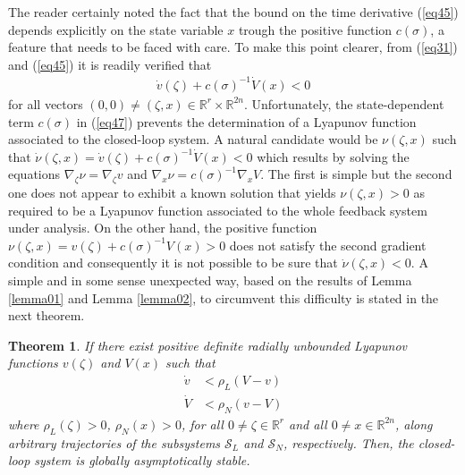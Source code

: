 \documentclass[twocolumn]{autarc_LH}
\newcommand{\Rf}{{\mathbb R}}
\newtheorem{theorem}{Theorem}
\begin{document}
The reader certainly noted the fact that the bound on the time derivative (\ref{eq45}) depends explicitly on the state variable $x$ trough the positive function $c(\sigma)$, a feature that needs to be faced with care. To make this point clearer, from (\ref{eq31}) and (\ref{eq45}) it is readily verified that 
\begin{align} 
\label{eq47} \dot v(\zeta) + c(\sigma)^{-1} \dot V(x) < 0
\end{align}
for all vectors $(0,0) \neq (\zeta, x) \in \Rf^{r} \times \Rf^{2n}$. Unfortunately, the state-dependent term $c(\sigma)$ in (\ref{eq47}) prevents the determination of a Lyapunov function associated to the closed-loop system. A natural candidate would be $\nu(\zeta,x)$ such that $\dot \nu(\zeta, x) = \dot v(\zeta) + c(\sigma)^{-1} \dot V(x) < 0$ which results by solving the equations $\nabla_{\zeta} \nu = \nabla_\zeta v$ and $\nabla_{x} \nu = c(\sigma)^{-1} \nabla_x V$. The first is simple but the second one does not appear to exhibit a known solution that yields $\nu(\zeta, x)>0$ as required to be a Lyapunov function associated to the whole feedback system under analysis. On the other hand, the positive function $\nu(\zeta,x)= v(\zeta) + c(\sigma)^{-1} V(x)>0$ does not satisfy the second gradient condition and consequently it is not possible to be sure that $\dot \nu(\zeta,x)<0$. A simple and in some sense unexpected way, based on the results of Lemma \ref{lemma01} and Lemma \ref{lemma02}, to circumvent this difficulty is stated in the next theorem.  
\begin{theorem} \label{theorem02}
If there exist positive definite radially unbounded Lyapunov functions $v(\zeta)$ and $V(x)$ such that 
\begin{align} 
\label{eq48} \dot v & < \rho_L  ( V - v )\\
\label{eq49} \dot V  & < \rho_N ( v - V )
\end{align}
where $\rho_L(\zeta)>0$, $\rho_N(x)>0$, for all $0 \neq \zeta \in \Rf^{r}$ and  all $0 \neq x \in \Rf^{2n}$, along arbitrary trajectories of the subsystems $\mathcal{S}_L$ and $\mathcal{S}_{N}$, respectively. Then, the closed-loop system is globally asymptotically stable. 
\end{theorem}
\end{document}
